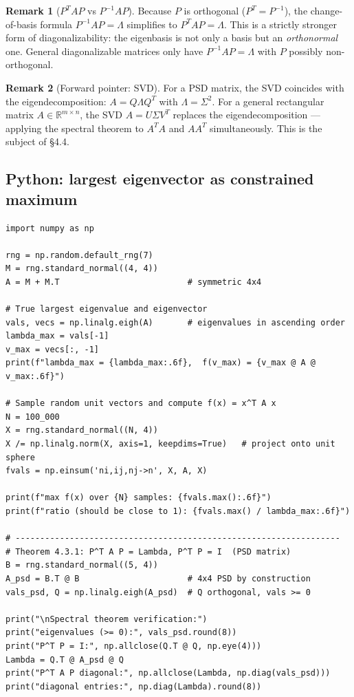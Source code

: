 \documentclass[11pt]{article}
\theoremstyle{definition}
\newtheorem{remark}{Remark}[section]
\theoremstyle{plain}
\begin{document}
\begin{remark}[$P^TAP$ vs $P^{-1}AP$]
  Because $P$ is orthogonal ($P^T = P^{-1}$), the change-of-basis formula
  $P^{-1}AP = \Lambda$ simplifies to $P^TAP = \Lambda$.  This is a strictly
  stronger form of diagonalizability: the eigenbasis is not only a basis but an
  \emph{orthonormal} one.  General diagonalizable matrices only have
  $P^{-1}AP = \Lambda$ with $P$ possibly non-orthogonal.
\end{remark}

\begin{remark}[Forward pointer: SVD]
  For a PSD matrix, the SVD coincides with the eigendecomposition:
  $A = Q\Lambda Q^T$ with $\Lambda = \Sigma^2$.  For a general rectangular
  matrix $A\in\mathbb{R}^{m\times n}$, the SVD $A = U\Sigma V^T$ replaces
  the eigendecomposition --- applying the spectral theorem to $A^TA$ and
  $AA^T$ simultaneously.  This is the subject of \S4.4.
\end{remark}

\subsection{Python: largest eigenvector as constrained maximum}
\begin{lstlisting}
import numpy as np

rng = np.random.default_rng(7)
M = rng.standard_normal((4, 4))
A = M + M.T                          # symmetric 4x4

# True largest eigenvalue and eigenvector
vals, vecs = np.linalg.eigh(A)       # eigenvalues in ascending order
lambda_max = vals[-1]
v_max = vecs[:, -1]
print(f"lambda_max = {lambda_max:.6f},  f(v_max) = {v_max @ A @ v_max:.6f}")

# Sample random unit vectors and compute f(x) = x^T A x
N = 100_000
X = rng.standard_normal((N, 4))
X /= np.linalg.norm(X, axis=1, keepdims=True)   # project onto unit sphere
fvals = np.einsum('ni,ij,nj->n', X, A, X)

print(f"max f(x) over {N} samples: {fvals.max():.6f}")
print(f"ratio (should be close to 1): {fvals.max() / lambda_max:.6f}")

# ------------------------------------------------------------------
# Theorem 4.3.1: P^T A P = Lambda, P^T P = I  (PSD matrix)
B = rng.standard_normal((5, 4))
A_psd = B.T @ B                      # 4x4 PSD by construction
vals_psd, Q = np.linalg.eigh(A_psd)  # Q orthogonal, vals >= 0

print("\nSpectral theorem verification:")
print("eigenvalues (>= 0):", vals_psd.round(8))
print("P^T P = I:", np.allclose(Q.T @ Q, np.eye(4)))
Lambda = Q.T @ A_psd @ Q
print("P^T A P diagonal:", np.allclose(Lambda, np.diag(vals_psd)))
print("diagonal entries:", np.diag(Lambda).round(8))
\end{lstlisting}
\end{document}
